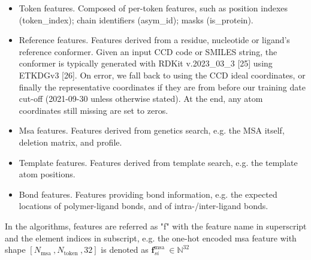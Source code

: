 \documentclass[10pt]{article}
\begin{document}
\begin{itemize}
  \item Token features. Composed of per-token features, such as position indexes (token\_index); chain identifiers (asym\_id); masks (is\_protein).
  \item Reference features. Features derived from a residue, nucleotide or ligand's reference conformer. Given an input CCD code or SMILES string, the conformer is typically generated with RDKit v.2023\_03\_3 [25] using ETKDGv3 [26]. On error, we fall back to using the CCD ideal coordinates, or finally the representative coordinates if they are from before our training date cut-off (2021-09-30 unless otherwise stated). At the end, any atom coordinates still missing are set to zeros.
  \item Msa features. Features derived from genetics search, e.g. the MSA itself, deletion matrix, and profile.
  \item Template features. Features derived from template search, e.g. the template atom positions.
  \item Bond features. Features providing bond information, e.g. the expected locations of polymer-ligand bonds, and of intra-/inter-ligand bonds.
\end{itemize}

In the algorithms, features are referred as "f" with the feature name in superscript and the element indices in subscript, e.g. the one-hot encoded msa feature with shape $\left[N_{\text {msa }}, N_{\text {token }}, 32\right]$ is denoted as $\mathbf{f}_{s i}^{\text {msa }} \in \mathbb{N}^{32}$
\end{document}

